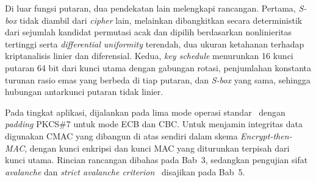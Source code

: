 Di luar fungsi putaran, dua pendekatan lain melengkapi rancangan. Pertama, \textit{S-box} tidak
diambil dari \textit{cipher} lain, melainkan dibangkitkan secara deterministik dari sejumlah kandidat
permutasi acak dan dipilih berdasarkan nonlinieritas tertinggi serta \textit{differential uniformity}
terendah, dua ukuran ketahanan terhadap kriptanalisis linier dan
diferensial. Kedua, \textit{key schedule} menurunkan 16 kunci putaran 64 bit dari kunci
utama dengan gabungan rotasi, penjumlahan konstanta turunan rasio emas yang berbeda di tiap
putaran, dan \textit{S-box} yang sama, sehingga hubungan antarkunci putaran tidak linier.

Pada tingkat aplikasi, \algname{} dijalankan pada lima mode operasi standar~\cite{rinaldi} dengan
\textit{padding} PKCS\#7 untuk mode ECB dan CBC. Untuk menjamin integritas data digunakan
CMAC yang dibangun di atas \algname{} sendiri dalam skema \textit{Encrypt-then-MAC}, dengan
kunci enkripsi dan kunci MAC yang diturunkan terpisah dari kunci utama. Rincian rancangan dibahas pada
Bab~3, sedangkan pengujian sifat \textit{avalanche} dan \textit{strict avalanche
criterion}~\cite{sucipta,angraini,prabowo} disajikan pada Bab~5.
